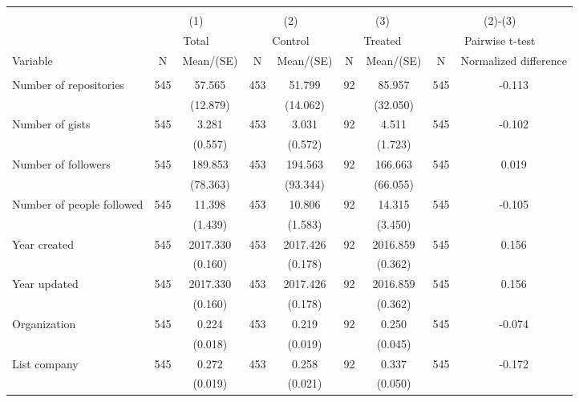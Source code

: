 \begin{tabular}{@{\extracolsep{5pt}}lcccccccc}
\\[-1.8ex]\hline \hline \\[-1.8ex]
 & \multicolumn{2}{c}{(1)}  & \multicolumn{2}{c}{(2)}  & \multicolumn{2}{c}{(3)}  & \multicolumn{2}{c}{(2)-(3)} \\
 & \multicolumn{2}{c}{Total}  & \multicolumn{2}{c}{Control}  & \multicolumn{2}{c}{Treated}  & \multicolumn{2}{c}{Pairwise t-test}  \\
Variable & N & Mean/(SE) & N & Mean/(SE) & N & Mean/(SE) & N & Normalized difference \\ \hline \\[-1.8ex] 
Number of repositories   & 545    & 57.565    & 453    & 51.799    & 92    & 85.957    & 545    & -0.113   \\
 &   & (12.879)  &   & (14.062)  &   & (32.050)  &   &  \\ [1ex]
Number of gists   & 545    & 3.281    & 453    & 3.031    & 92    & 4.511    & 545    & -0.102   \\
 &   & (0.557)  &   & (0.572)  &   & (1.723)  &   &  \\ [1ex]
Number of followers   & 545    & 189.853    & 453    & 194.563    & 92    & 166.663    & 545    & 0.019   \\
 &   & (78.363)  &   & (93.344)  &   & (66.055)  &   &  \\ [1ex]
Number of people followed   & 545    & 11.398    & 453    & 10.806    & 92    & 14.315    & 545    & -0.105   \\
 &   & (1.439)  &   & (1.583)  &   & (3.450)  &   &  \\ [1ex]
Year created   & 545    & 2017.330    & 453    & 2017.426    & 92    & 2016.859    & 545    & 0.156   \\
 &   & (0.160)  &   & (0.178)  &   & (0.362)  &   &  \\ [1ex]
Year updated   & 545    & 2017.330    & 453    & 2017.426    & 92    & 2016.859    & 545    & 0.156   \\
 &   & (0.160)  &   & (0.178)  &   & (0.362)  &   &  \\ [1ex]
Organization   & 545    & 0.224    & 453    & 0.219    & 92    & 0.250    & 545    & -0.074   \\
 &   & (0.018)  &   & (0.019)  &   & (0.045)  &   &  \\ [1ex]
List company   & 545    & 0.272    & 453    & 0.258    & 92    & 0.337    & 545    & -0.172   \\
 &   & (0.019)  &   & (0.021)  &   & (0.050)  &   &  \\ [1ex]

\end{tabular}
